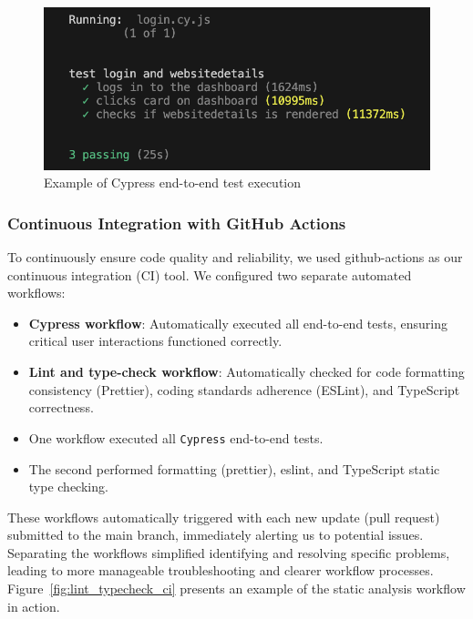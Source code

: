 \begin{figure}[H]
    \centering
    \includegraphics[width=0.8\linewidth]{figures/cypress_test.png}
    \caption{Example of Cypress end-to-end test execution}
    \label{fig:cypress_test}
\end{figure}

\subsubsection{Continuous Integration with GitHub Actions}
To continuously ensure code quality and reliability, we used \gls{github-actions} as our continuous integration (CI) tool. We configured two separate automated workflows:


\begin{itemize}
    \item \textbf{Cypress workflow}: Automatically executed all end-to-end tests, ensuring critical user interactions functioned correctly.
    \item \textbf{Lint and type-check workflow}: Automatically checked for code formatting consistency (Prettier), coding standards adherence (ESLint), and TypeScript correctness.
\end{itemize}


\begin{itemize}
    \item One workflow executed all \texttt{Cypress} end-to-end tests.
    \item The second performed formatting (\gls{prettier}), \gls{eslint}, and TypeScript static type checking.
\end{itemize}

These workflows automatically triggered with each new update (pull request) submitted to the main branch, immediately alerting us to potential issues. Separating the workflows simplified identifying and resolving specific problems, leading to more manageable troubleshooting and clearer workflow processes. Figure~\ref{fig:lint_typecheck_ci} presents an example of the static analysis workflow in action.

